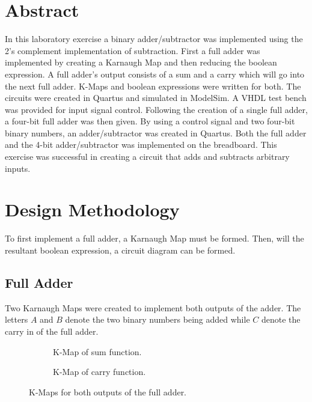 \documentclass[CMPE]{KGCOEReport}
\begin{document}
\maketitle

\section*{Abstract}
In this laboratory exercise a binary adder/subtractor was implemented using the 2's complement implementation of subtraction. First a full adder was implemented by creating a Karnaugh Map and then reducing the boolean expression. A full adder's output consists of a sum and a carry which will go into the next full adder. K-Maps and boolean expressions were written for both. The circuits were created in Quartus and simulated in ModelSim. A VHDL test bench was provided for input signal control. Following the creation of a single full adder, a four-bit full adder was then given. By using a control signal and two four-bit binary numbers, an adder/subtractor was created in Quartus. Both the full adder and the 4-bit adder/subtractor was implemented on the breadboard. This exercise was successful in creating a circuit that adds and subtracts arbitrary inputs.

\section*{Design Methodology}

To first implement a full adder, a Karnaugh Map must be formed. Then, will the resultant boolean expression, a circuit diagram can be formed.

\subsection*{Full Adder}

Two Karnaugh Maps were created to implement both outputs of the adder. The letters $A$ and $B$ denote the two binary numbers being added while $C$ denote the carry in of the full adder.

\begin{figure}[h!]
	\begin{subfigure}{.5\textwidth}
		\centering
		\begin{Karnaugh24}
		\end{Karnaugh24}
		\caption{K-Map of sum function.}
		\label{fig:sum}
	\end{subfigure}
	\begin{subfigure}{.5\textwidth}
		\centering
		\begin{Karnaugh24}
				\contingut{0,0,0,1,
						   0,1,1,1}
		   \implicant{5}{7}{blue}
		   \implicant{7}{6}{red}
		   \implicant{3}{7}{green}
		\end{Karnaugh24}
		\caption{K-Map of carry function.}
		\label{fig:carry}
	\end{subfigure}
	
	\caption{K-Maps for both outputs of the full adder.}
	\label{fig:kmap}
\end{figure}
\end{document}

